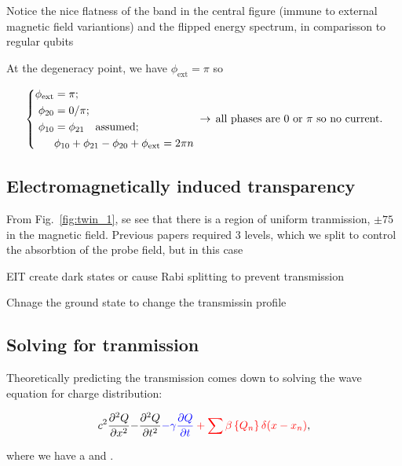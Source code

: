  \noindent Notice the nice flatness of the band in the central figure (immune to external magnetic field variantions) and the flipped energy spectrum, in comparisson to regular qubits
 
 At the degeneracy point, we have $ \phi_\text{ext} = \pi $ so 
 
 \[
 	\left\lbrace\begin{aligned}
 		\phi_\text{ext} & = \pi;\\
 		\phi_{20} & = 0/\pi;\\
 		\phi_{10} & = \phi_{21} \quad \text{assumed};\\
 		& \phi_{10} +\phi_{21} - \phi_{20} + \phi_\text{ext} = 2\pi n
 	\end{aligned}\right. \,\rightarrow\, \text{all phases are 0 or $ \pi $ so no current}.
 \]
 
 \subsection{Electromagnetically induced transparency}
 From Fig.~\ref{fig:twin_1}, se see that there is a region of uniform tranmission, $ \pm75 $ in the magnetic field.  Previous papers required 3 levels, which we split to control the absorbtion of the probe field, but in this case 
 
 \begin{center}
 	\parbox{0.4\linewidth}{EIT create dark states or cause Rabi splitting to prevent transmission} \ira \parbox{0.4\linewidth}{Chnage the ground state  \ira \iket{\pi} to change the transmissin profile}
 \end{center}
 
 \subsection{Solving for tranmission}
  Theoretically predicting the transmission comes down to solving the wave equation for charge distribution:
  
  \begin{equation}\label{key}
  	c^2 \frac{\partial^2Q}{\partial x^2} {-  \frac{\partial^2Q}{\partial t^2}} {\color{red}{\textcolor{blue}{- \gamma \ensuremath{ \frac{\partial Q}{\partial t}}} + \sum \beta\left\lbrace Q_n\right\rbrace\delta(x - x_n)}},
  \end{equation}
  
  \noindent where we have a  and . 
  
